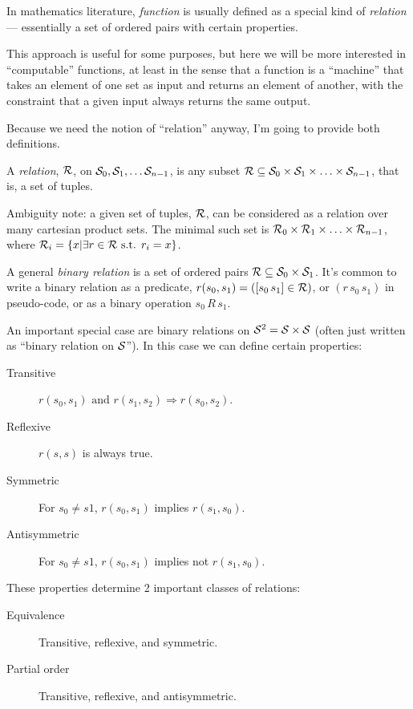 \label{sec:Functions}

In mathematics literature, \textit{function} is usually defined as
a special kind of \textit{relation} --- essentially a set of
ordered pairs with certain properties.

This approach is useful for some purposes, but here we will be
more interested in ``computable'' functions, at least in the sense
that a function is a ``machine'' that takes an element of one set
as input and returns an element of another, with the constraint
that a given input always returns the same output.

Because we need the notion of ``relation'' anyway, I'm going to
provide both definitions.

\label{sec:Relations}

A \textit{relation}, 
$\mathcal{R}$, on $\mathcal{S}_0, \mathcal{S}_1, \ldots \mathcal{S}_{n-1}$,  
is any subset 
$\mathcal{R} \subseteq \mathcal{S}_0 \times \mathcal{S}_1 \times \ldots 
\times \mathcal{S}_{n-1}$,
that is, a set of tuples.

Ambiguity note: a given set of tuples, $\mathcal{R}$, can be
considered as a relation over many cartesian product sets.
The minimal such set is 
$\mathcal{R}_0 \times \mathcal{R}_1 \times \ldots \times
\mathcal{R}_{n-1}$, 
where 
$\mathcal{R}_i = \{ x | \exists r 
\in \mathcal{R} \text{ s.t. } r_i = x\}$.

A general \textit{binary relation} is a set of ordered
pairs $\mathcal{R} \subseteq \mathcal{S}_0 \times \mathcal{S}_1$.
It's common to write a binary relation as a predicate, 
$r(s_0,s_1) = ([s_0 \, s_1] \in \mathcal{R})$,
or $(r \, s_0 \, s_1)$ in pseudo-code,
or as a binary operation $s_0 \, R \, s_1$.

An important special case
are binary relations on $\mathcal{S}^2 = \mathcal{S} \times \mathcal{S}$
(often just written as ``binary relation on $\mathcal{S}$''). 
In this case we can define certain properties:

\begin{description}
\item[Transitive]
$r(s_0,s_1) \text{ and } r(s_1,s_2) \Rightarrow r(s_0,s_2)$.
\item[Reflexive] $r(s,s)$ is always true.
\item[Symmetric] For $s_0 \neq s1$, $r(s_0,s_1)$ implies
$r(s_1,s_0)$.
\item[Antisymmetric] For $s_0 \neq s1$, $r(s_0,s_1)$ implies not
$r(s_1,s_0)$.
\end{description}
These properties determine 2 important classes of relations:
\begin{description}
\item[Equivalence] Transitive, reflexive, and symmetric.
\item[Partial order] \label{def:partial-order}
Transitive, reflexive, and antisymmetric.
\end{description}


